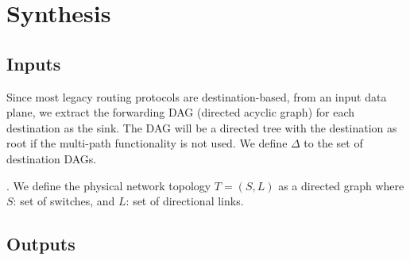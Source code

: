 \section{Synthesis}

\subsection{Inputs}
Since most legacy routing protocols are destination-based,
from an input data plane, we extract the forwarding
DAG (directed acyclic graph) for each destination
as the sink. The DAG will be a directed tree with the
destination as root if the multi-path
functionality is not used. We define $\Delta$ to 
the set of destination DAGs. 

. 
We define the physical network topology $T = (S, L)$
as a directed graph where $S$: set of switches, and 
$L$: set of directional links. 

\subsection{Outputs}
